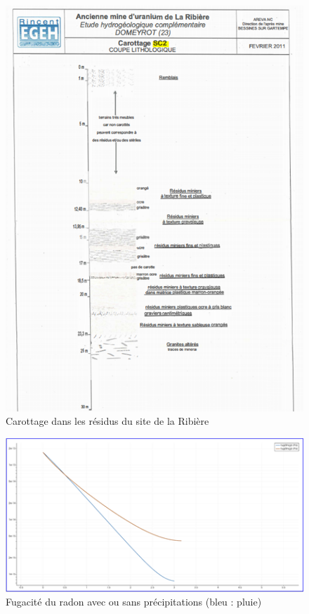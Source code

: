 \documentclass{article}
\begin{document}
\begin{figure}[H]
    \centering
    \includegraphics[width = \textwidth]{III_C_1.png}
    \caption{Carottage dans les résidus du site de la Ribière}
    \label{fig:carottage_residus}
\end{figure}

\begin{figure}[H]
    \centering
    \includegraphics[width = \textwidth]{III_C_6.png}
    \caption{Fugacité du radon avec ou sans précipitations (bleu : pluie)}
    \label{fig:rain_fugacity}
\end{figure}
\end{document}
